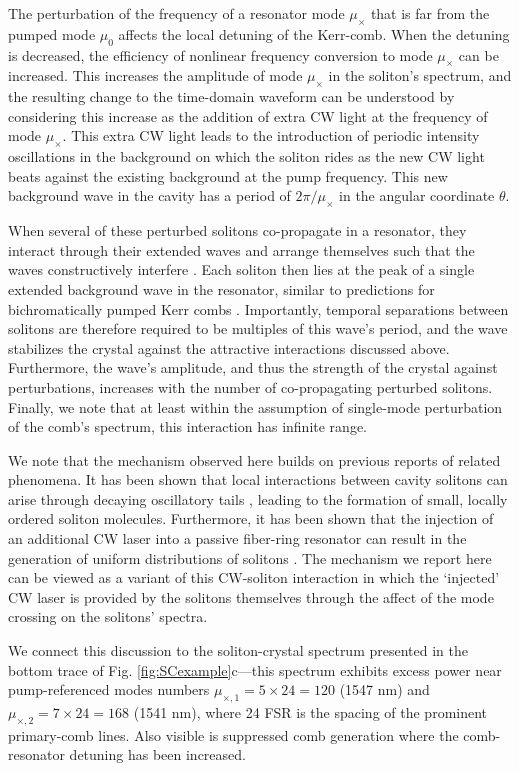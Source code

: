 The perturbation of the frequency of a resonator mode $\mu_\times$ that is far from the pumped mode $\mu_0$ affects the local detuning of the Kerr-comb. When the detuning is decreased, the efficiency of nonlinear frequency conversion to mode $\mu_\times$ can be increased. This increases the amplitude of mode $\mu_\times$ in the soliton's spectrum, and the resulting change to the time-domain waveform can be understood by considering this increase as the addition of extra CW light at the frequency of mode $\mu_\times$. This extra CW light leads to the introduction of periodic intensity oscillations in the background on which the soliton rides as the new CW light beats against the existing background at the pump frequency. This new background wave in the cavity has a period of $2\pi/\mu_\times$ in the angular coordinate $\theta$. 

When several of these perturbed solitons co-propagate in a resonator, they interact through their extended waves and arrange themselves such that the waves constructively interfere \cite{Wang2017} . Each soliton then lies at the peak of a single extended background wave in the resonator, similar to predictions for bichromatically pumped Kerr combs \cite{Hansson2014}. Importantly, temporal separations between solitons are therefore required to be multiples of this wave's period, and the wave stabilizes the crystal against the attractive interactions discussed above. Furthermore, the wave's amplitude, and thus the strength of the crystal against perturbations, increases with the number of co-propagating perturbed solitons. Finally, we note that at least within the assumption of single-mode perturbation of the comb's spectrum, this interaction has infinite range. 

We note that the mechanism observed here builds on previous reports of related phenomena. It has been shown that local interactions between cavity solitons can arise through decaying oscillatory tails \cite{Skryabin1999}, leading to the formation of small, locally ordered soliton molecules. Furthermore, it has been shown that the injection of an additional CW laser into a passive fiber-ring resonator can result in the generation of uniform distributions of solitons \cite{Wabnitz1996}. The mechanism we report here can be viewed as a variant of this CW-soliton interaction in which the `injected' CW laser is provided by the solitons themselves through the affect of the mode crossing on the solitons' spectra.

We connect this discussion to the soliton-crystal spectrum presented in the bottom trace of Fig. \ref{fig:SCexample}c---this spectrum exhibits excess power near pump-referenced modes numbers $\mu_{\times,1}=5\times24=120$ (1547 nm) and $\mu_{\times,2}=7\times24=168$  (1541 nm), where 24 FSR is the spacing of the prominent primary-comb lines. Also visible is suppressed comb generation where the comb-resonator detuning has been increased. 

